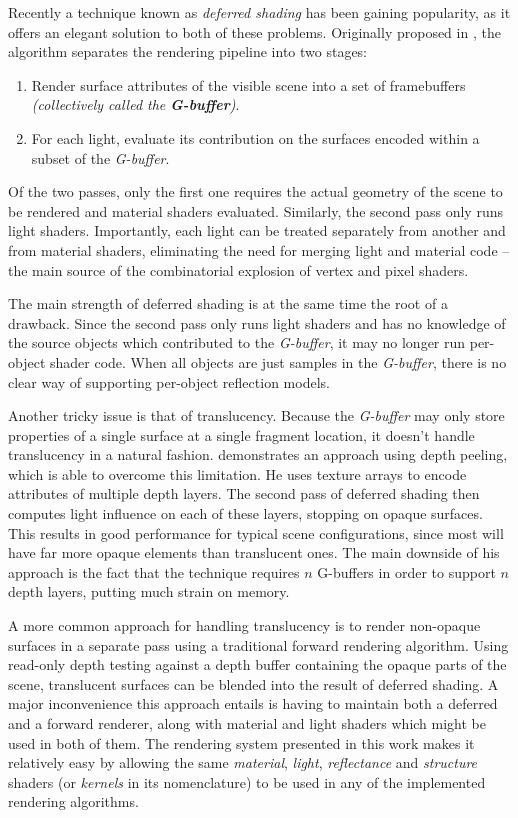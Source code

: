 Recently a technique known as \emph{deferred shading} has been gaining popularity, as it offers an elegant solution to both of these problems. Originally proposed in \citet{DeeringDeferred}, the algorithm separates the rendering pipeline into two stages:

\begin{enumerate}
\item Render surface attributes of the visible scene into a set of framebuffers \emph{(collectively called the \textbf{G-buffer})}.
\item For each light, evaluate its contribution on the surfaces encoded within a subset of the \emph{G-buffer}.
\end{enumerate}

Of the two passes, only the first one requires the actual geometry of the scene to be rendered and material shaders evaluated. Similarly, the second pass only runs light shaders. Importantly, each light can be treated separately from another and from material shaders, eliminating the need for merging light and material code -- the main source of the combinatorial explosion of vertex and pixel shaders.

The main strength of deferred shading is at the same time the root of a drawback. Since the second pass only runs light shaders and has no knowledge of the source objects which contributed to the \emph{G-buffer}, it may no longer run per-object shader code. When all objects are just samples in the \emph{G-buffer}, there is no clear way of supporting per-object reflection models.

Another tricky issue is that of translucency. Because the \emph{G-buffer} may only store properties of a single surface at a single fragment location, it doesn't handle translucency in a natural fashion. \citet{HumusDeepDeferred} demonstrates an approach using depth peeling, which is able to overcome this limitation. He uses texture arrays to encode attributes of multiple depth layers. The second pass of deferred shading then computes light influence on each of these layers, stopping on opaque surfaces. This results in good performance for typical scene configurations, since most will have far more opaque elements than translucent ones. The main downside of his approach is the fact that the technique requires $n$ G-buffers in order to support $n$ depth layers, putting much strain on memory.

A more common approach for handling translucency is to render non-opaque surfaces in a separate pass using a traditional forward rendering algorithm. Using read-only depth testing against a depth buffer containing the opaque parts of the scene, translucent surfaces can be blended into the result of deferred shading. A major inconvenience this approach entails is having to maintain both a deferred and a forward renderer, along with material and light shaders which might be used in both of them. The rendering system presented in this work makes it relatively easy by allowing the same \emph{material}, \emph{light}, \emph{reflectance} and \emph{structure} shaders (or \emph{kernels} in its nomenclature) to be used in any of the implemented rendering algorithms.

